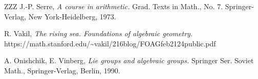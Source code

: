 \documentclass[11pt]{article}
\numberwithin{equation}{section}
\numberwithin{footnote}{section}
\begin{document}
\begin{thebibliography}{ZZZ}
  J.-P. Serre,  \textit{A course in arithmetic.}
Grad. Texts in Math., No. 7.
Springer-Verlag, New York-Heidelberg, 1973.

 R. Vakil, \textit{The rising sea. Foundations of algebraic geometry.}
https://math.stanford.edu/\~{}vakil/216blog/FOAGfeb2124public.pdf

 A. Onishchik, E. Vinberg, 
\textit{Lie groups and algebraic groups.}
Springer Ser. Soviet Math., Springer-Verlag, Berlin, 1990.

\end{thebibliography}
\end{document}
